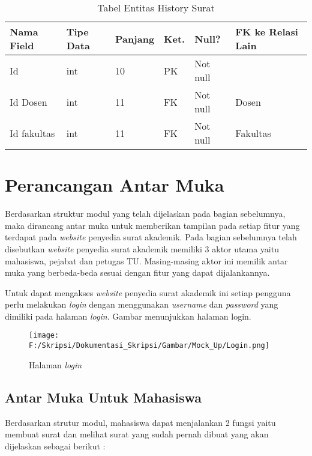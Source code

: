 \begin{table}[H]
\centering
\caption{Tabel Entitas History Surat}
\label{entitas_history_surat}
\begin{tabular}{|l|l|l|l|l|l|}
\hline
\textbf{Nama Field}&\textbf{Tipe Data}&\textbf{Panjang}&\textbf{Ket.}&\textbf{Null?}&\textbf{FK ke Relasi Lain}\\ \hline
Id&int&10&PK&Not null&\\ \hline
Id Dosen&int&11&FK&Not null&Dosen\\ \hline
Id fakultas&int&11&FK&Not null&Fakultas\\ \hline
\end{tabular}
\end{table}

\section{Perancangan Antar Muka}
\label{sec:perancangan_antar_muka}
Berdasarkan struktur modul yang telah dijelaskan pada bagian sebelumnya, maka dirancang antar muka untuk memberikan tampilan pada setiap fitur yang terdapat pada \textit{website} penyedia surat akademik. Pada bagian sebelumnya telah disebutkan \textit{website} penyedia surat akademik memiliki 3 aktor utama yaitu mahasiswa, pejabat dan petugas TU. Masing-masing aktor ini memilik antar muka yang berbeda-beda sesuai dengan fitur yang dapat dijalankannya.

Untuk dapat mengakses \textit{website} penyedia surat akademik ini setiap pengguna perlu melakukan \textit{login} dengan menggunakan \textit{username} dan \textit{password} yang dimiliki pada halaman \textit{login}. Gambar menunjukkan halaman login.
\begin{figure}[H]
	\centering
		\texttt{[image: F:/Skripsi/Dokumentasi\_Skripsi/Gambar/Mock\_Up/Login.png]}
		\caption{Halaman \textit{login}}
		\label{fig:halaman_login}
	\end{figure}

\subsection{Antar Muka Untuk Mahasiswa}
\label{sec:antar_muka_mahasiswa}
Berdasarkan strutur modul, mahasiswa dapat menjalankan 2 fungsi yaitu membuat surat dan melihat surat yang sudah pernah dibuat yang akan dijelaskan sebagai berikut :

